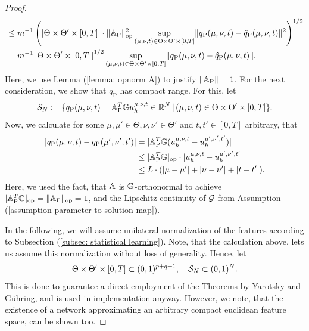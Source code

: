 \begin{proof}
\begin{equation}
\begin{aligned}
            &\leq m^{-1} \left( \left| \Theta \times \Theta' \times [0, T] \right| \cdot \lVert \mathbb{A}_\text{P} \rVert_\text{op}^2 
            \sup_{(\mu, \nu, t) \in \Theta \times \Theta' \times [0, T]} 
            \lVert q_\text{P}(\mu, \nu, t) - \hat{q}_\text{P}(\mu, \nu, t) \rVert^2 \right)^{1/2} \\
            &= m^{-1} \left| \Theta \times \Theta' \times [0, T] \right|^{1/2} 
            \sup_{(\mu, \nu, t) \in \Theta \times \Theta' \times [0, T]} 
            \lVert q_\text{P}(\mu, \nu, t) - \hat{q}_\text{P}(\mu, \nu, t) \rVert.
        \end{aligned}
    \end{equation}
    Here, we use Lemma (\ref{lemma: opnorm A}) to justify $\lVert \mathbb{A}_\text{P} \rVert = 1$.
    For the next consideration, we show that $q_\text{P}$ has compact range. For this, let 
    \begin{equation*}
        \mathcal{S}_N := \{q_\text{P}(\mu, \nu, t) = \mathbb{A}_\text{P}^T \mathbb{G} u_h^{\mu, \nu, t} \in \mathbb{R}^N \, \vert \, (\mu, \nu, t) 
        \in \Theta \times \Theta' \times [0, T] \}.
    \end{equation*}
    Now, we calculate for some $\mu, \mu' \in \Theta, \nu, \nu' \in \Theta'$ and $t, t' \in [0, T]$ arbitrary, that
    \begin{align*}
        \lvert q_\text{P}(\mu, \nu, t) - q_\text{P}(\mu', \nu', t') \rvert &= \lvert \mathbb{A}_\text{P}^T \mathbb{G} (u_h^{\mu, \nu, t} - u_h^{\mu', \nu', t'}) \rvert \\
        &\leq \lvert \mathbb{A}_\text{P}^T \mathbb{G} \rvert_\text{op} \cdot \lvert u_h^{\mu, \nu, t} - u_h^{\mu', \nu', t'} \rvert\\
        &\leq L \cdot (\lvert \mu - \mu' \rvert + \lvert \nu - \nu' \rvert + \lvert t - t' \rvert).
    \end{align*}
    Here, we used the fact, that $\mathbb{A}$ is $\mathbb{G}$-orthonormal to achieve $\lvert \mathbb{A}_\text{P}^T \mathbb{G} \rvert_\text{op} = 
    \lVert \mathbb{A}_\text{P} \rVert_\text{op} = 1$,
    and the Lipschitz continuity of $\mathcal{G}$ from Assumption (\ref{assumption parameter-to-solution map}).
    
    In the following, we will assume unilateral
    normalization of the features according to 
    Subsection (\ref{subsec: statistical learning}). Note, that the calculation above, lets us assume this normalization
    without loss of generality. Hence, let
    \begin{equation*}
        \Theta \times \Theta' \times [0, T] \subset (0, 1)^{p+q+1}, \quad \mathcal{S}_N \subset (0, 1)^N.
    \end{equation*}
    This is done to guarantee a direct employment of the Theorems by Yarotsky and Gühring, 
    and is used in implementation anyway. However, we note,
    that the existence of a network approximating an arbitrary compact euclidean feature space, 
    can be shown too.


\end{proof}
